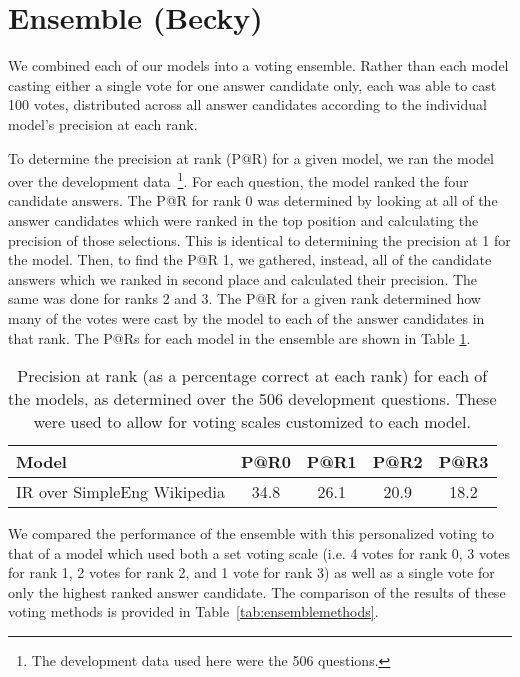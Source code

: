 \section{Ensemble (Becky)}
\label{sec:ensemble}

We combined each of our models into a voting ensemble.  Rather than each model casting either a single vote for one answer candidate only, each was able to cast 100 votes, distributed across all answer candidates according to the individual model's precision at each rank.

To determine the precision at rank (P@R) for a given model, we ran the model over the development data~\footnote{The development data used here were the 506 questions.}.  For each question, the model ranked the four candidate answers.  The P@R for rank 0 was determined by looking at all of the answer candidates which were ranked in the top position and calculating the precision of those selections.  This is identical to determining the precision at 1 for the model.  Then, to find the P@R 1, we gathered, instead, all of the candidate answers which we ranked in second place and calculated their precision.  The same was done for ranks 2 and 3.  The P@R for a given rank determined how many of the votes were cast by the model to each of the answer candidates in that rank.  The P@Rs for each model in the ensemble are shown in Table \ref{tab:p@r}.

\begin{table}[htp]
\caption{Precision at rank (as a percentage correct at each rank) for each of the models, as determined over the 506 development questions.  These were used to allow for voting scales customized to each model.}
\begin{center}
\begin{tabular}{lcccc}
Model & P@R0 & P@R1 & P@R2 & P@R3\\
\hline
IR over SimpleEng Wikipedia & 34.8 & 26.1 & 20.9 & 18.2 \\
\hline
\end{tabular}
\end{center}
\label{tab:p@r}
\end{table}%

	
We compared the performance of the ensemble with this personalized voting to that of a model which used both a set voting scale (i.e. 4 votes for rank 0, 3 votes for rank 1, 2 votes for rank 2, and 1 vote for rank 3) as well as a single vote for only the highest ranked answer candidate.  The comparison of the results of these voting methods is provided in Table~\ref{tab:ensemblemethods}.